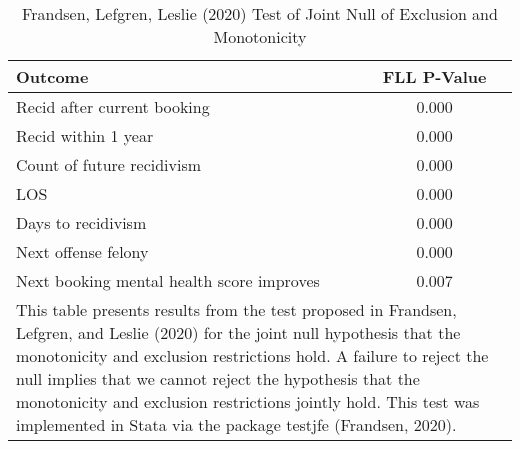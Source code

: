 \begin{table}[htbp]
\centering
\def\sym#1{\ifmmode^{#1}\else\(^{#1}\)\fi}
\caption{Frandsen, Lefgren, Leslie (2020) Test of Joint Null of Exclusion and Monotonicity}\label{tab:mono}
\begin{tabular}{p{.5\linewidth}*{1}{c}}
\toprule
Outcome & FLL P-Value\\ 
\midrule
Recid after current booking   &    0.000 \\
Recid within 1 year   &    0.000 \\
Count of future recidivism   &    0.000 \\
LOS   &    0.000 \\
Days to recidivism   &    0.000 \\
Next offense felony   &    0.000 \\
Next booking mental health score improves   &    0.007 \\
\bottomrule
\multicolumn{2}{p{.7\linewidth}}{\footnotesize This table presents results from the test proposed in Frandsen, Lefgren, and Leslie (2020) for the joint null hypothesis that the monotonicity and exclusion restrictions hold.  A failure to reject the null implies that we cannot reject the hypothesis that the monotonicity and exclusion restrictions jointly hold. This test was implemented in Stata via the package testjfe (Frandsen, 2020).}\\
\end{tabular}
\end{table}